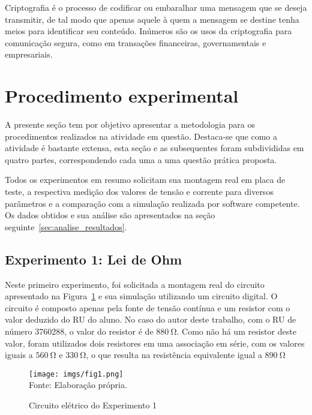 \documentclass[a4paper,pra,aps,twocolumn,superscriptaddress,10pt,final]{revtex4-2}
\begin{document}
    Criptografia é o processo de codificar ou embaralhar uma mensagem que se deseja transmitir, de tal modo que apenas aquele à quem a mensagem se destine tenha meios para identificar seu conteúdo. Inúmeros são os usos da criptografia para comunicação segura, como em transações financeiras, governamentais e empresariais. 

\section{Procedimento experimental}
\label{sec:proced_exp}

    A presente seção tem por objetivo apresentar a metodologia para os procedimentos realizados na atividade em questão. Destaca-se que como a atividade é bastante extensa, esta seção e as subsequentes foram subdivididas em quatro partes, correspondendo cada uma a uma questão prática proposta.

    Todos os experimentos em resumo solicitam sua montagem real em placa de teste, a respectiva medição dos valores de tensão e corrente para diversos parâmetros e a comparação com a simulação realizada por software competente. Os dados obtidos e sua análise são apresentados na seção seguinte~\ref{sec:analise_resultados}.

\subsection{Experimento 1: Lei de Ohm}
\label{subsec:exp_lei_ohm}

    Neste primeiro experimento, foi solicitada a montagem real do circuito apresentado na Figura~\ref{fig:circuito1} e sua simulação utilizando um circuito digital. O circuito é composto apenas pela fonte de tensão contínua e um resistor com o valor deduzido do RU do aluno. No caso do autor deste trabalho, com o RU de número 3760288, o valor do resistor é de $\qty{880}{\ohm}$. Como não há um resistor deste valor, foram utilizados dois resistores em uma associação em série, com os valores iguais a $\qty{560}{\ohm}$ e $\qty{330}{\ohm}$, o que resulta na resistência equivalente igual a $\qty{890}{\ohm}$

    \begin{figure}[H]
        \centering
        \caption{Circuito elétrico do Experimento 1}
        \texttt{[image: imgs/fig1.png]}\\
        \scriptsize{Fonte: Elaboração própria.}
        \label{fig:circuito1}
    \end{figure}
\end{document}
